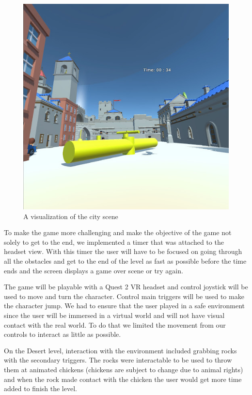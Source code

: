 \documentclass{vgtc}                          %
\begin{document}
 \begin{figure}[tb]
  \centering %
  \includegraphics[width=\columnwidth]{city2.jpg}
  \caption{A visualization of the city scene}
 \end{figure}
To make the game more challenging and make the objective of the game not solely to get to the end, we implemented a timer that was attached to the headset view.  With this timer the user will have to be focused on going through all the obstacles and get to the end of the level as fast as possible before the time ends and the screen displays a game over scene or try again.

The game will be playable with a Quest 2 VR headset and control joystick will be used to move and turn the character.  Control main triggers will be used to make the character jump. We had to ensure that the user played in a safe environment since the user will be immersed in a virtual world and will not have visual contact with the real world. To do that we limited the movement from our controls to interact as little as possible.  

On the Desert level, interaction with the environment included grabbing rocks with the secondary triggers. The rocks were interactable to be used to throw them at animated chickens (chickens are subject to change due to animal rights) and when the rock made contact with the chicken the user would get more time added to finish the level.
\end{document}
